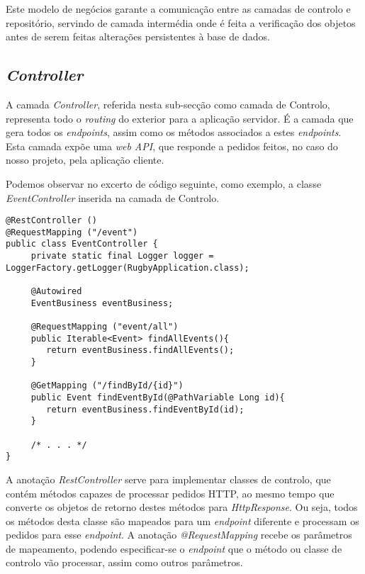 Este modelo de negócios garante a comunicação entre as camadas de controlo e repositório, servindo de camada intermédia onde é feita a verificação dos objetos antes de serem feitas alterações persistentes à base de dados.

\subsection{\emph{Controller}} \label{sec314}
A camada \emph{Controller}, referida nesta sub-secção como camada de Controlo, representa todo o \emph{routing} do exterior para a aplicação servidor. É a camada que gera todos os \emph{endpoints}, assim como os métodos associados a estes \emph{endpoints}. Esta camada expõe uma \textit{web API}, que responde a pedidos feitos, no caso do nosso projeto, pela aplicação cliente.

Podemos observar no excerto de código seguinte, como exemplo, a classe \emph{EventController} inserida na camada de Controlo.

\begin{lstlisting}
@RestController ()
@RequestMapping ("/event")
public class EventController {
	 private static final Logger logger = LoggerFactory.getLogger(RugbyApplication.class);
	
	 @Autowired
	 EventBusiness eventBusiness;
	
	 @RequestMapping ("event/all")
	 public Iterable<Event> findAllEvents(){
	 	return eventBusiness.findAllEvents();
	 }
	
	 @GetMapping ("/findById/{id}")
	 public Event findEventById(@PathVariable Long id){
	 	return eventBusiness.findEventById(id);
	 }
	
	 /* . . . */
}
\end{lstlisting}

A anotação \emph{RestController} serve para implementar classes de controlo, que contém métodos capazes de processar pedidos HTTP, ao mesmo tempo que converte os objetos de retorno destes métodos para \emph{HttpResponse}.
Ou seja, todos os métodos desta classe são mapeados para um \emph{endpoint} diferente e processam os pedidos para esse \emph{endpoint}.
A anotação \emph{@RequestMapping} recebe os parâmetros de mapeamento, podendo especificar-se o \emph{endpoint} que o método ou classe de controlo vão processar, assim como outros parâmetros. 

